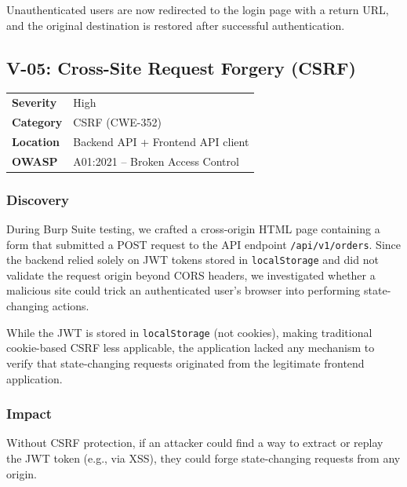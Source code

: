 \documentclass[12pt,a4paper]{article}
\begin{document}
Unauthenticated users are now redirected to the login page with a return URL, and the original destination is restored after successful authentication.

\subsection{V-05: Cross-Site Request Forgery (CSRF)}

\begin{table}[H]
\centering
\begin{tabularx}{\textwidth}{lX}
\toprule
\textbf{Severity} & \textcolor{high}{High} \\
\textbf{Category} & CSRF (CWE-352) \\
\textbf{Location} & Backend API + Frontend API client \\
\textbf{OWASP} & A01:2021 -- Broken Access Control \\
\bottomrule
\end{tabularx}
\end{table}

\subsubsection{Discovery}

During Burp Suite testing, we crafted a cross-origin HTML page containing a form that submitted a POST request to the API endpoint \texttt{/api/v1/orders}. Since the backend relied solely on JWT tokens stored in \texttt{localStorage} and did not validate the request origin beyond CORS headers, we investigated whether a malicious site could trick an authenticated user's browser into performing state-changing actions.

While the JWT is stored in \texttt{localStorage} (not cookies), making traditional cookie-based CSRF less applicable, the application lacked any mechanism to verify that state-changing requests originated from the legitimate frontend application.

\subsubsection{Impact}

Without CSRF protection, if an attacker could find a way to extract or replay the JWT token (e.g., via XSS), they could forge state-changing requests from any origin.
\end{document}
